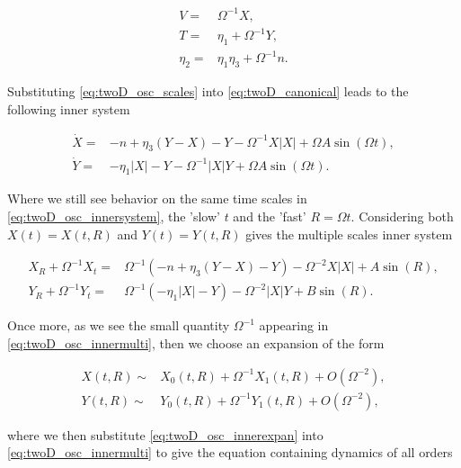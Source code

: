 \begin{equation}\label{eq:twoD_osc_scales}
\begin{aligned}
V=&\Omega^{-1}X,\\
T=& \eta_1 +\Omega^{-1}Y,\\
\eta_2=&\eta_1\eta_3+\Omega^{-1} n.
\end{aligned}
\end{equation}

Substituting \eqref{eq:twoD_osc_scales} into \eqref{eq:twoD_canonical} leads to the following inner system

\begin{equation}\label{eq:twoD_osc_innersystem}
\begin{aligned}
\dot{X}=& -n+\eta_3(Y-X)-Y-\Omega^{-1}X|X| +\Omega A\sin(\Omega t),\\
\dot{Y}=& -\eta_1|X|-Y -\Omega^{-1}|X|Y +\Omega A \sin(\Omega t).
\end{aligned}
\end{equation}

Where we still see behavior on the same time scales in \eqref{eq:twoD_osc_innersystem}, the 'slow' $t$ and the 'fast' $R=\Omega t$. Considering both $X(t)=X(t,R)$ and $Y(t)=Y(t,R)$ gives the multiple scales inner system

\begin{equation}\label{eq:twoD_osc_innermulti}
\begin{aligned}
X_R+\Omega^{-1}X_t =& \Omega^{-1}\left(-n +\eta_3(Y-X)-Y\right)-\Omega^{-2}X|X|+A\sin(R),\\
Y_R+\Omega^{-1}Y_t =& \Omega^{-1}\left(-\eta_1|X|-Y\right)-\Omega^{-2}|X|Y+ B\sin(R).
\end{aligned}
\end{equation}

Once more, as we see the small quantity $\Omega^{-1}$ appearing in \eqref{eq:twoD_osc_innermulti}, then we choose an expansion of the form

\begin{equation}\label{eq:twoD_osc_innerexpan}
\begin{aligned}
X(t,R)\sim& X_0(t,R)+\Omega^{-1}X_1(t,R)+O(\Omega^{-2}),\\
Y(t,R)\sim& Y_0(t,R)+\Omega^{-1}Y_1(t,R)+O(\Omega^{-2}),
\end{aligned}
\end{equation}

where we then substitute \eqref{eq:twoD_osc_innerexpan} into \eqref{eq:twoD_osc_innermulti} to give the equation containing dynamics of all orders


